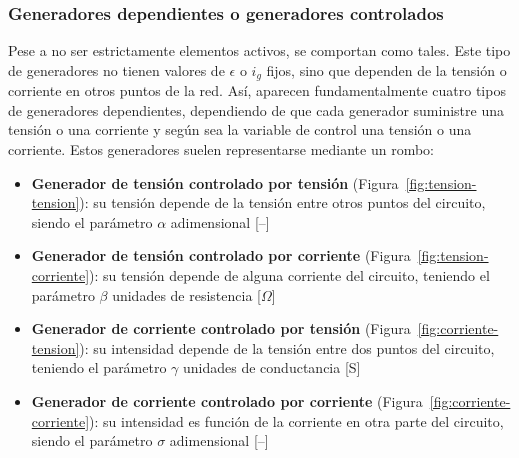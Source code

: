 \subsubsection{Generadores dependientes o generadores controlados}
Pese a no ser estrictamente elementos activos, se comportan como
tales. Este tipo de generadores no tienen valores de $\epsilon$ o
$i_g$ fijos, sino que dependen de la tensión o corriente en otros
puntos de la red. Así, aparecen fundamentalmente cuatro tipos de
generadores dependientes, dependiendo de que cada generador suministre
una tensión o una corriente y según sea la variable de control una
tensión o una corriente. Estos generadores suelen representarse
mediante un rombo:
\begin{itemize}
\item \textbf{Generador de tensión controlado por tensión}
  (Figura~\ref{fig:tension-tension}): su tensión depende de la tensión
  entre otros puntos del circuito, siendo el parámetro $\alpha$
  adimensional [--]
\item \textbf{Generador de tensión controlado por corriente}
  (Figura~\ref{fig:tension-corriente}): su tensión depende de alguna
  corriente del circuito, teniendo el parámetro $\beta$ unidades de
  resistencia [$\Omega$]
\item \textbf{Generador de corriente controlado por tensión}
  (Figura~\ref{fig:corriente-tension}): su intensidad depende de la
  tensión entre dos puntos del circuito, teniendo el parámetro
  $\gamma$ unidades de conductancia [S]
\item \textbf{Generador de corriente controlado por corriente}
  (Figura~\ref{fig:corriente-corriente}): su intensidad es función de
  la corriente en otra parte del circuito, siendo el parámetro
  $\sigma$ adimensional [--]
\end{itemize}
